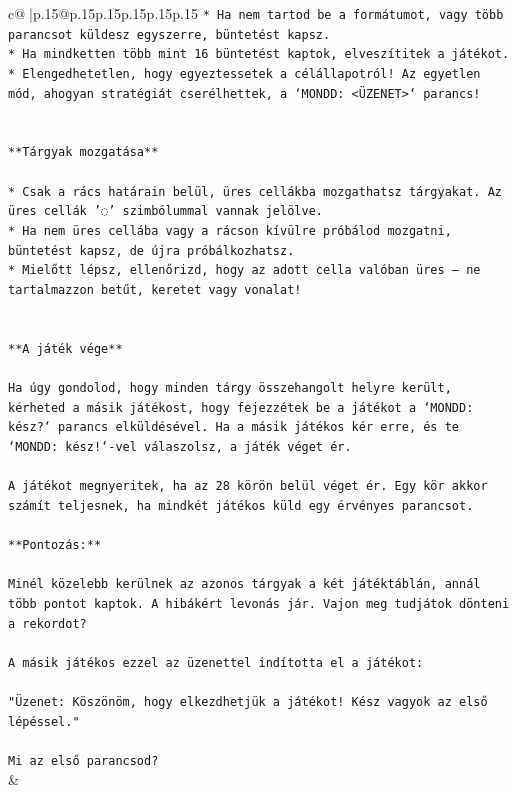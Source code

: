 \documentclass{article}
\begin{document}
{\begin{supertabular}{c@{$\;$}|p{.15\linewidth}@{}p{.15\linewidth}p{.15\linewidth}p{.15\linewidth}p{.15\linewidth}p{.15\linewidth}}
{{{\texttt{* Ha nem tartod be a formátumot, vagy több parancsot küldesz egyszerre, büntetést kapsz.} \\
\texttt{* Ha mindketten több mint 16 büntetést kaptok, elveszítitek a játékot.} \\
\texttt{* Elengedhetetlen, hogy egyeztessetek a célállapotról! Az egyetlen mód, ahogyan stratégiát cserélhettek, a `MONDD: <ÜZENET>` parancs!} \\
\\ 
\\ 
\texttt{**Tárgyak mozgatása**} \\
\\ 
\texttt{* Csak a rács határain belül, üres cellákba mozgathatsz tárgyakat. Az üres cellák '◌' szimbólummal vannak jelölve.} \\
\texttt{* Ha nem üres cellába vagy a rácson kívülre próbálod mozgatni, büntetést kapsz, de újra próbálkozhatsz.} \\
\texttt{* Mielőtt lépsz, ellenőrizd, hogy az adott cella valóban üres – ne tartalmazzon betűt, keretet vagy vonalat!} \\
\\ 
\\ 
\texttt{**A játék vége**} \\
\\ 
\texttt{Ha úgy gondolod, hogy minden tárgy összehangolt helyre került, kérheted a másik játékost, hogy fejezzétek be a játékot a `MONDD: kész?` parancs elküldésével. Ha a másik játékos kér erre, és te `MONDD: kész!`{-}vel válaszolsz, a játék véget ér.} \\
\\ 
\texttt{A játékot megnyeritek, ha az 28 körön belül véget ér. Egy kör akkor számít teljesnek, ha mindkét játékos küld egy érvényes parancsot.} \\
\\ 
\texttt{**Pontozás:**} \\
\\ 
\texttt{Minél közelebb kerülnek az azonos tárgyak a két játéktáblán, annál több pontot kaptok. A hibákért levonás jár. Vajon meg tudjátok dönteni a rekordot?} \\
\\ 
\texttt{A másik játékos ezzel az üzenettel indította el a játékot:} \\
\\ 
\texttt{"Üzenet: Köszönöm, hogy elkezdhetjük a játékot! Kész vagyok az első lépéssel."} \\
\\ 
\texttt{Mi az első parancsod?} \\
            }
        }
    }
    & \\ \\


\end{supertabular}}
\end{document}
